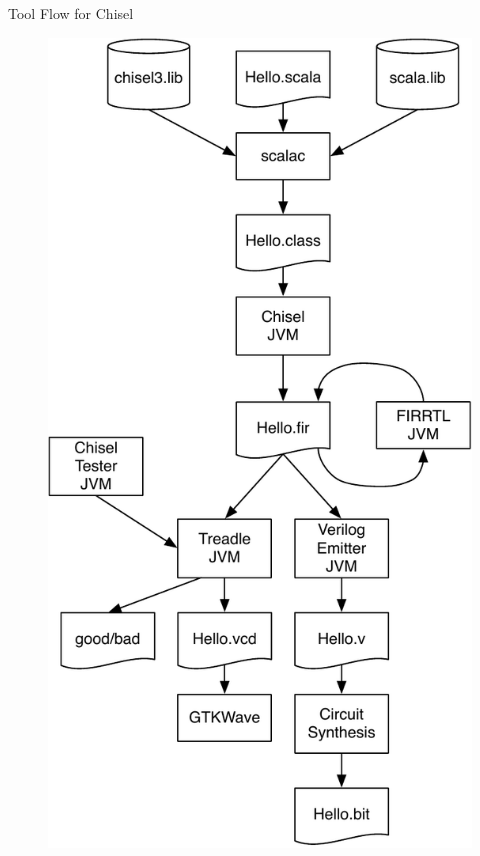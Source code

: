 \documentclass[xcolor=pdflatex,dvipsnames,table]{beamer}
\begin{document}
\begin{frame}[fragile]{Tool Flow for Chisel}
\begin{figure}
    \centering
    \includegraphics[scale=0.35]{../figures/flow}
\end{figure}
\end{frame}
\end{document}
